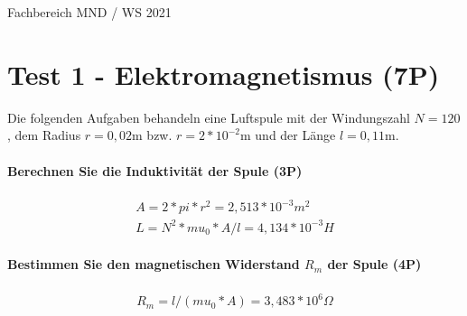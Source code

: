 \documentclass{article}
\begin{document}
Fachbereich MND / WS 2021


\part*{Test 1 - Elektromagnetismus (7P)}

Die folgenden Aufgaben behandeln eine Luftspule mit der Windungszahl $N=120$, dem Radius $r=0{,}02$m bzw. $r=2*10^{ -2 }$m und der Länge $l=0{,}11$m.

\subsection*{Berechnen Sie die Induktivität der Spule (3P)}


\begin{gather}
A=2 * pi * r ^ 2=2{,}513*10^{-3}m^2 \\
L=N ^ 2 * mu_0 * A / l=4{,}134*10^{-3}H
\end{gather}

\subsection*{Bestimmen Sie den magnetischen Widerstand $R_{m}$ der Spule (4P)}


\begin{gather}
R_{m}=l / (mu_0 * A)=3{,}483*10^{6}\Omega
\end{gather}
\end{document}
